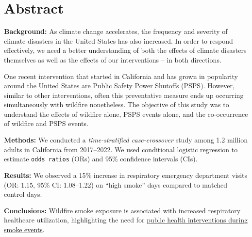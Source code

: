 \documentclass[../main.tex]{subfiles}
\begin{document}
\section{Abstract}
\textbf{Background:} As climate change accelerates, the frequency and severity of climate disasters in the United States has also increased. In order to respond effectively, we need a better understanding of both the effects of climate disasters themselves as well as the effects of our interventions -- in both directions. 

One recent intervention that started in California and has grown in popularity around the United States are Public Safety Power Shutoffs (PSPS). However, similar to other interventions, often this preventative measure ends up occurring simultaneously with wildfire \PM nonetheless. The objective of this study was to understand the effects of wildfire \PM alone, PSPS events alone, and the co-occurrence of wildfire \PM and PSPS events.

\textbf{Methods:} We conducted a \textit{time-stratified case-crossover} study among 1.2 million adults in California from 2017--2022. We used conditional logistic regression to estimate \texttt{odds ratios} (ORs) and 95\% confidence intervals (CIs).

\textbf{Results:} We observed a 15\% increase in respiratory emergency department visits (OR: 1.15, 95\% CI: 1.08--1.22) on ``high smoke'' days compared to matched control days.

\textbf{Conclusions:} Wildfire smoke exposure is associated with increased respiratory healthcare utilization, highlighting the need for \underline{public health interventions during smoke events}.


\clearpage
\end{document}
